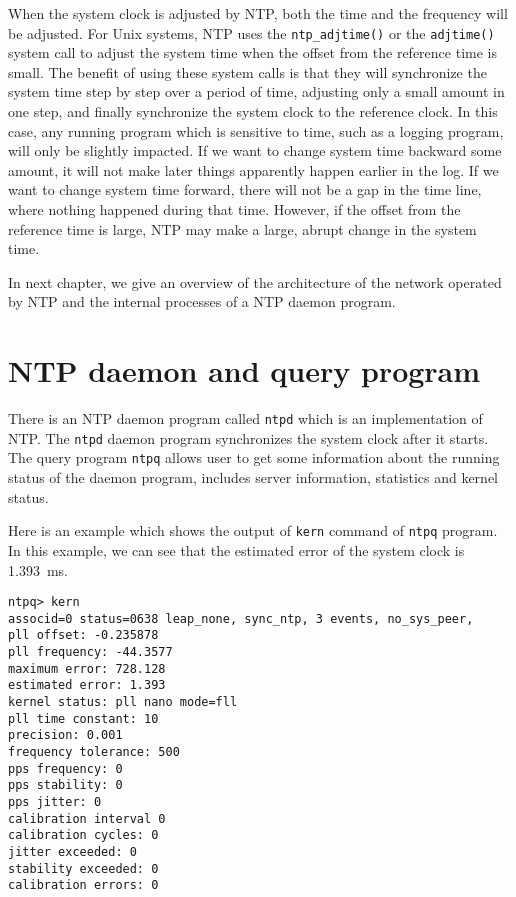 When the system clock is adjusted by NTP\null, both the time and the frequency
will be adjusted. For Unix systems, NTP uses the \verb|ntp_adjtime()| or
the \verb|adjtime()| system call to adjust the system time when the offset from
the reference time is small.
The benefit of using these system calls is that they will synchronize the
system time step by
step over a period of time, adjusting only a small amount in one step, and finally
synchronize the system clock to the reference clock. In this case, any running
program which is sensitive to
time, such as a logging program, will only be slightly impacted. If we want to
change system time backward some amount, it will not make later things
apparently happen earlier in the log. If we want to change system time forward,
there will not be a gap in the time line, where nothing happened during that
time. However, if the offset from the reference time is large, NTP may make a
large, abrupt change in the system time.

In next chapter, we give an overview of the architecture of the network
operated by NTP and the internal processes of a NTP daemon program.

\section{NTP daemon and query program}%
\label{sec:ntp_daemon_and_query_program}
There is an NTP daemon program called \verb|ntpd| which is an implementation of
NTP\null. The \verb|ntpd| daemon program synchronizes the system clock after it
starts. The query program \verb|ntpq| allows user to get some information about
the running status of the daemon program, includes server information,
statistics and kernel status.

Here is an example which shows the output of \verb|kern| command of \verb|ntpq|
program. In this example, we can see that the estimated error of the system
clock is 1.393~ms.
\begin{verbatim}
ntpq> kern
associd=0 status=0638 leap_none, sync_ntp, 3 events, no_sys_peer,
pll offset: -0.235878
pll frequency: -44.3577
maximum error: 728.128
estimated error: 1.393
kernel status: pll nano mode=fll
pll time constant: 10
precision: 0.001
frequency tolerance: 500
pps frequency: 0
pps stability: 0
pps jitter: 0
calibration interval 0
calibration cycles: 0
jitter exceeded: 0
stability exceeded: 0
calibration errors: 0
\end{verbatim}




